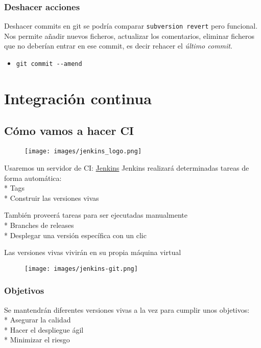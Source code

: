 \subsubsection{Deshacer acciones}

Deshacer commits en git se podría comparar \texttt{subversion revert}
pero funcional.\\Nos permite añadir nuevos ficheros, actualizar los
comentarios, eliminar ficheros que no deberían entrar en ese commit, es
decir rehacer el \emph{último commit}.

\begin{itemize}
\item
  \texttt{git commit -{}-amend}
\end{itemize}
\section{Integración continua}

\subsection{Cómo vamos a hacer CI}

\begin{figure}[htbp]
\centering
\texttt{[image: images/jenkins\_logo.png]}
\caption{}
\end{figure}

Usaremos un servidor de CI: \href{http://jenkins-ci.org/}{Jenkins}
Jenkins realizará determinadas tareas de forma automática:\\* Tags\\*
Construir las versiones vivas

También proveerá tareas para ser ejecutadas manualmente\\* Branches de
releases\\* Desplegar una versión específica con un clic

Las versiones vivas vivirán en su propia máquina virtual

\begin{figure}[htbp]
\centering
\texttt{[image: images/jenkins-git.png]}
\caption{}
\end{figure}

\subsubsection{Objetivos}

Se mantendrán diferentes versiones vivas a la vez para cumplir unos
objetivos: \\* Asegurar la calidad\\* Hacer el despliegue ágil\\*
Minimizar el riesgo

